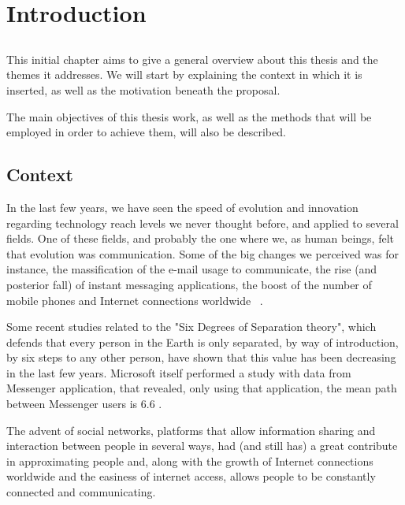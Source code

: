 \chapter{Introduction} \label{chap:intro}

\section*{}

This initial chapter aims to give a general overview about this thesis and the themes it addresses. We will start by explaining the context in which it is inserted, as well as the motivation beneath the proposal.

The main objectives of this thesis work, as well as the methods that will be employed in order to achieve them, will also be described.



\section{Context} \label{sec:context}

In the last few years, we have seen the speed of evolution and innovation regarding technology reach levels we never thought before, and applied to several fields. One of these fields, and probably the one where we, as human beings, felt that evolution was communication. 
Some of the big changes we perceived was for instance, the massification of the e-mail usage to communicate, the rise (and posterior fall) of instant messaging applications, the boost of the number of mobile phones and Internet connections worldwide ~\cite{kn:Int13}.

Some recent studies related to the "Six Degrees of Separation theory", which defends that every person in the Earth is only separated, by way of introduction, by six steps to any other person, have shown that this value has been decreasing in the last few years. Microsoft itself performed a study with data from Messenger application, that revealed, only using that application, the mean path between Messenger users is 6.6 \cite{kn:LH07}.

The advent of social networks, platforms that allow information sharing and interaction between people in several ways, had (and still has) a great contribute in approximating people and, along with the growth of Internet connections worldwide and the easiness of internet access, allows people to be constantly connected and communicating.

